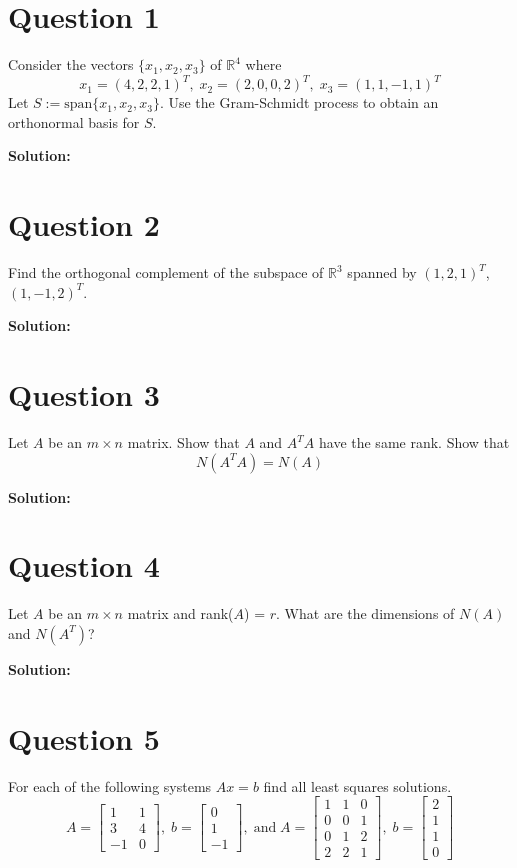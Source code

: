 \documentclass{article}
\begin{document}
\section*{Question 1}
Consider the vectors $\{x_1, x_2, x_3\}$ of $\mathbb{R}^4$ where
$$ x_1 = (4, 2, 2, 1)^T, \; x_2 = (2, 0, 0, 2)^T, \; x_3 = (1, 1, -1 ,1)^T $$
Let $S := \text{span} \{x_1, x_2, x_3\}$.
Use the Gram-Schmidt process to obtain an orthonormal basis for $S$.

\vspace{0.5cm}
\noindent\textbf{Solution:}


\section*{Question 2}
Find the orthogonal complement of the subspace of $\mathbb{R}^3$ spanned by $(1, 2, 1)^T$, $(1, -1, 2)^T$.

\vspace{0.5cm}
\noindent\textbf{Solution:}


\section*{Question 3}
Let $A$ be an $m \times n$ matrix.
Show that $A$ and $A^TA$ have the same rank.
Show that $$ N(A^T A) = N(A) $$

\vspace{0.5cm}
\noindent\textbf{Solution:}

\section*{Question 4}
Let $A$ be an $m \times n$ matrix and rank($A$) = $r$.
What are the dimensions of $N(A)$ and $N(A^T)$?

\vspace{0.5cm}
\noindent\textbf{Solution:}

\section*{Question 5}
For each of the following systems $Ax = b$ find all least squares solutions.
$$
A = \begin{bmatrix} 1 & 1 \\ 3 & 4 \\ -1 & 0 \end{bmatrix}, \; b = \begin{bmatrix} 0 \\ 1 \\ -1 \end{bmatrix}, \; \text{and} \;
A = \begin{bmatrix} 1 & 1 & 0 \\ 0 & 0 & 1 \\ 0 & 1 & 2 \\ 2 & 2 & 1 \end{bmatrix}, \; b = \begin{bmatrix} 2 \\ 1 \\ 1 \\ 0 \end{bmatrix}
$$
\end{document}
